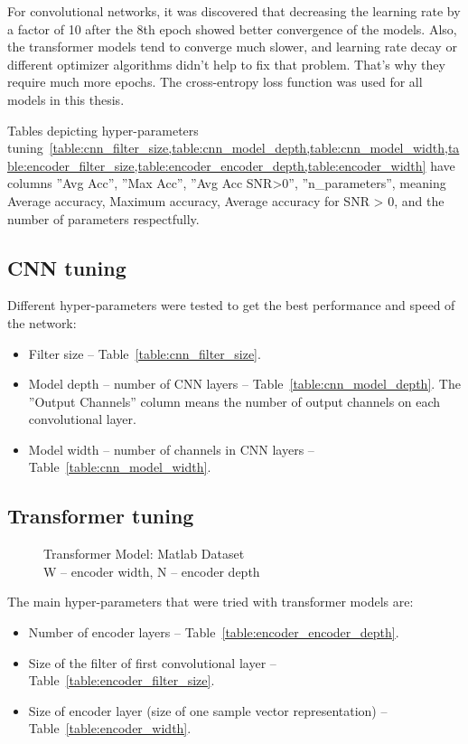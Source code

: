 For convolutional networks, it was discovered that decreasing the learning rate by a factor of 10 after the 8th epoch showed better convergence of the models. Also, the transformer models tend to converge much slower, and learning rate decay or different optimizer algorithms didn't help to fix that problem. That's why they require much more epochs. The cross-entropy loss function was used for all models in this thesis. 

Tables depicting hyper-parameters tuning~\cref{table:cnn_filter_size,table:cnn_model_depth,table:cnn_model_width,table:encoder_filter_size,table:encoder_encoder_depth,table:encoder_width} have columns ''Avg Acc'', ''Max Acc'', ''Avg Acc SNR>0'', ''n\_parameters'', meaning Average accuracy, Maximum accuracy, Average accuracy for SNR > 0, and the number of parameters respectfully.

\subsection{CNN tuning}

Different hyper-parameters were tested to get the best performance and speed of the network:
\begin{itemize}
    \item Filter size -- Table~\ref{table:cnn_filter_size}.
    \item Model depth -- number of CNN layers -- Table~\ref{table:cnn_model_depth}. The ''Output Channels'' column means the number of output channels on each convolutional layer.
    \item Model width -- number of channels in CNN layers -- Table~\ref{table:cnn_model_width}.
\end{itemize}

\subsection{Transformer tuning}

\begin{figure}[t]
\centering
\caption{ Transformer Model: Matlab Dataset\\W -- encoder width, N -- encoder depth}

\label{fig:encoder_model}
\end{figure}

The main hyper-parameters that were tried with transformer models are: 
\begin{itemize}
    \item Number of encoder layers -- Table~\ref{table:encoder_encoder_depth}.
    \item Size of the filter of first convolutional layer -- Table~\ref{table:encoder_filter_size}.
    \item Size of encoder layer (size of one sample vector representation) -- Table~\ref{table:encoder_width}.
\end{itemize}


